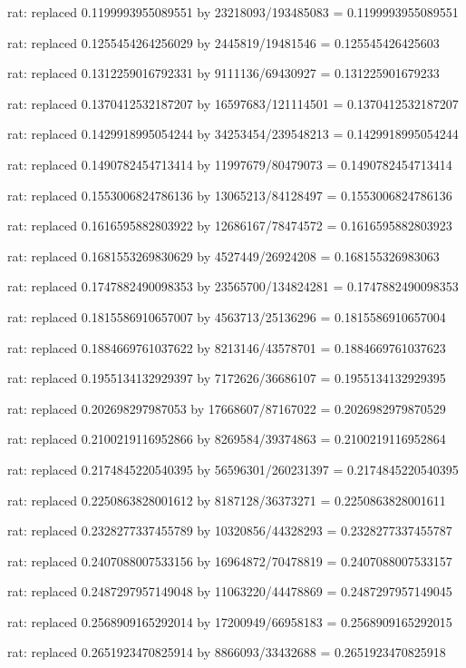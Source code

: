 \documentclass[a4paper,10pt]{article}
\begin{document}
\begin{eulernotebook}
\begin{eulercomment}
\begin{eulercomment}
\begin{eulercomment}
\begin{eulercomment}
\begin{eulercomment}
\begin{eulercomment}
\begin{eulercomment}
\begin{eulercomment}
\begin{eulercomment}
\begin{eulercomment}
\begin{eulercomment}
\begin{eulercomment}
\begin{eulercomment}
\begin{eulercomment}
\begin{eulercomment}
\begin{eulercomment}
\begin{euleroutput}
  rat: replaced 0.1199993955089551 by 23218093/193485083 = 0.1199993955089551
  
  rat: replaced 0.1255454264256029 by 2445819/19481546 = 0.125545426425603
  
  rat: replaced 0.1312259016792331 by 9111136/69430927 = 0.131225901679233
  
  rat: replaced 0.1370412532187207 by 16597683/121114501 = 0.1370412532187207
  
  rat: replaced 0.1429918995054244 by 34253454/239548213 = 0.1429918995054244
  
  rat: replaced 0.1490782454713414 by 11997679/80479073 = 0.1490782454713414
  
  rat: replaced 0.1553006824786136 by 13065213/84128497 = 0.1553006824786136
  
  rat: replaced 0.1616595882803922 by 12686167/78474572 = 0.1616595882803923
  
  rat: replaced 0.1681553269830629 by 4527449/26924208 = 0.168155326983063
  
  rat: replaced 0.1747882490098353 by 23565700/134824281 = 0.1747882490098353
  
  rat: replaced 0.1815586910657007 by 4563713/25136296 = 0.1815586910657004
  
  rat: replaced 0.1884669761037622 by 8213146/43578701 = 0.1884669761037623
  
  rat: replaced 0.1955134132929397 by 7172626/36686107 = 0.1955134132929395
  
  rat: replaced 0.202698297987053 by 17668607/87167022 = 0.2026982979870529
  
  rat: replaced 0.2100219116952866 by 8269584/39374863 = 0.2100219116952864
  
  rat: replaced 0.2174845220540395 by 56596301/260231397 = 0.2174845220540395
  
  rat: replaced 0.2250863828001612 by 8187128/36373271 = 0.2250863828001611
  
  rat: replaced 0.2328277337455789 by 10320856/44328293 = 0.2328277337455787
  
  rat: replaced 0.2407088007533156 by 16964872/70478819 = 0.2407088007533157
  
  rat: replaced 0.2487297957149048 by 11063220/44478869 = 0.2487297957149045
  
  rat: replaced 0.2568909165292014 by 17200949/66958183 = 0.2568909165292015
  
  rat: replaced 0.2651923470825914 by 8866093/33432688 = 0.2651923470825918
  

\end{euleroutput}
\end{eulercomment}
\end{eulercomment}
\end{eulercomment}
\end{eulercomment}
\end{eulercomment}
\end{eulercomment}
\end{eulercomment}
\end{eulercomment}
\end{eulercomment}
\end{eulercomment}
\end{eulercomment}
\end{eulercomment}
\end{eulercomment}
\end{eulercomment}
\end{eulercomment}
\end{eulercomment}
\end{eulernotebook}
\end{document}
